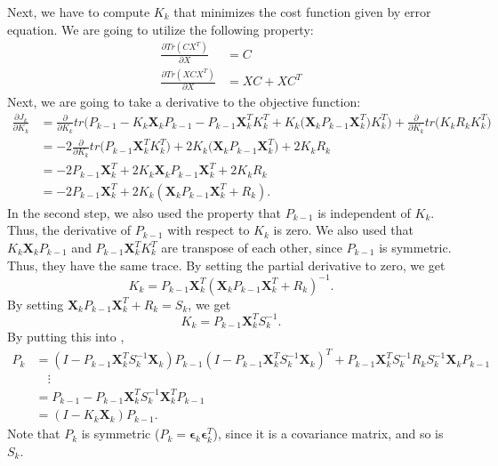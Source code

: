 Next, we have to compute $K_k$ that minimizes the cost function given by error equation. We are going to utilize the following property:
\begin{align*}
	\frac{\partial Tr(CX^T)}{\partial X} &= C\\
	\frac{\partial Tr(XCX^T)}{\partial X} &= XC + XC^T
\end{align*}
Next, we are going to take a derivative to the objective function:
\begin{align*}
	\frac{\partial J_k}{\partial K_k} &= \frac{\partial}{\partial K_k} tr\big(P_{k-1}- K_k\mathbf{X}_k P_{k-1} - P_{k-1}\mathbf{X}_k^TK_k^T+K_k\big(\mathbf{X}_kP_{k-1}\mathbf{X}_k^T\big)K_k^T\big)+ \frac{\partial}{\partial K_k}tr\big(K_k R_k K_k^T\big)\\
									  &= -2\frac{\partial}{\partial K_k} tr\big(P_{k-1}\mathbf{X}_k^TK_k^T\big)+2K_k\big(\mathbf{X}_kP_{k-1}\mathbf{X}_k^T\big)+2K_kR_k\\
									  &= -2P_{k-1}\mathbf{X}_k^T+ 2K_k\mathbf{X}_kP_{k-1}\mathbf{X}_k^T+2K_kR_k\\
									  &= -2P_{k-1}\mathbf{X}_k^T+ 2K_k(\mathbf{X}_kP_{k-1}\mathbf{X}_k^T+R_k).
\end{align*}
In the second step, we also used the property that $P_{k-1}$ is independent of $K_k$. Thus, the derivative of $P_{k-1}$ with respect to $K_k$ is zero. We also used that $K_k\mathbf{X}_kP_{k-1}$ and $P_{k-1}\mathbf{X}_k^TK_k^T$ are transpose of each other, since $P_{k-1}$ is symmetric. Thus, they have the same trace. By setting the partial derivative to zero, we get
$$K_k = P_{k-1}\mathbf{X}_k^T(\mathbf{X}_kP_{k-1}\mathbf{X}_k^T+R_k)^{-1}.$$
By setting $\mathbf{X}_kP_{k-1}\mathbf{X}_k^T+R_k = S_k$, we get 
$$K_k = P_{k-1}\mathbf{X}_k^TS_k^{-1}.$$
By putting this into ,
\begin{align*}
	P_k &= (I-P_{k-1}\mathbf{X}_k^TS_k^{-1} \mathbf{X}_k)P_{k-1}(I-P_{k-1}\mathbf{X}_k^TS_k^{-1} \mathbf{X}_k)^T+P_{k-1}\mathbf{X}_k^TS_k^{-1} R_k S_k^{-1}\mathbf{X}_kP_{k-1}\\ 
		&\quad \vdots\\
		&= P_{k-1}-P_{k-1}\mathbf{X}_k^TS_k^{-1}\mathbf{X}_k^TP_{k-1}\\
		&= (I-K_k\mathbf{X}_k)P_{k-1}.
\end{align*}
Note that $P_k$ is symmetric (\cf $P_k=\boldsymbol{\epsilon}_{k}\boldsymbol{\epsilon}_{k}^T$), since it is a covariance matrix, and so is $S_k$.

